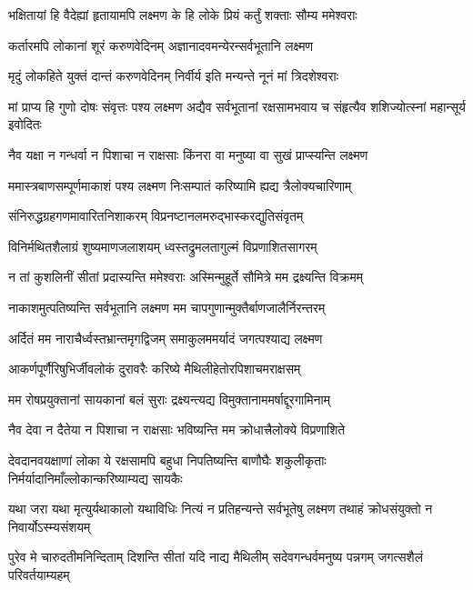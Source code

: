\twolineshloka
{भक्षितायां हि वैदेह्यां हृतायामपि लक्ष्मण}
{के हि लोके प्रियं कर्तुं शक्ताः सौम्य ममेश्वराः} %

\twolineshloka
{कर्तारमपि लोकानां शूरं करुणवेदिनम्}
{अज्ञानादवमन्येरन्सर्वभूतानि लक्ष्मण} %

\twolineshloka
{मृदुं लोकहिते युक्तं दान्तं करुणवेदिनम्}
{निर्वीर्य इति मन्यन्ते नूनं मां त्रिदशेश्वराः} %

\threelineshloka
{मां प्राप्य हि गुणो दोषः संवृत्तः पश्य लक्ष्मण}
{अद्यैव सर्वभूतानां रक्षसामभवाय च}
{संहृत्यैव शशिज्योत्स्नां महान्सूर्य इवोदितः} %

\twolineshloka
{नैव यक्षा न गन्धर्वा न पिशाचा न राक्षसाः}
{किंनरा वा मनुष्या वा सुखं प्राप्स्यन्ति लक्ष्मण} %

\twolineshloka
{ममास्त्रबाणसम्पूर्णमाकाशं पश्य लक्ष्मण}
{निःसम्पातं करिष्यामि ह्यद्य त्रैलोक्यचारिणाम्} %

\twolineshloka
{संनिरुद्धग्रहगणमावारितनिशाकरम्}
{विप्रनष्टानलमरुद्भास्करद्युतिसंवृतम्} %

\twolineshloka
{विनिर्मथितशैलाग्रं शुष्यमाणजलाशयम्}
{ध्वस्तद्रुमलतागुल्मं विप्रणाशितसागरम्} %

\twolineshloka
{न तां कुशलिनीं सीतां प्रदास्यन्ति ममेश्वराः}
{अस्मिन्मुहूर्ते सौमित्रे मम द्रक्ष्यन्ति विक्रमम्} %

\twolineshloka
{नाकाशमुत्पतिष्यन्ति सर्वभूतानि लक्ष्मण}
{मम चापगुणान्मुक्तैर्बाणजालैर्निरन्तरम्} %

\twolineshloka
{अर्दितं मम नाराचैर्ध्वस्तभ्रान्तमृगद्विजम्}
{समाकुलममर्यादं जगत्पश्याद्य लक्ष्मण} %

\twolineshloka
{आकर्णपूर्णैरिषुभिर्जीवलोकं दुरावरैः}
{करिष्ये मैथिलीहेतोरपिशाचमराक्षसम्} %

\twolineshloka
{मम रोषप्रयुक्तानां सायकानां बलं सुराः}
{द्रक्ष्यन्त्यद्य विमुक्तानाममर्षाद्दूरगामिनाम्} %

\twolineshloka
{नैव देवा न दैतेया न पिशाचा न राक्षसाः}
{भविष्यन्ति मम क्रोधात्त्रैलोक्ये विप्रणाशिते} %

\threelineshloka
{देवदानवयक्षाणां लोका ये रक्षसामपि}
{बहुधा निपतिष्यन्ति बाणौघैः शकुलीकृताः}
{निर्मर्यादानिमाँल्लोकान्करिष्याम्यद्य सायकैः} %

\threelineshloka
{यथा जरा यथा मृत्युर्यथाकालो यथाविधिः}
{नित्यं न प्रतिहन्यन्ते सर्वभूतेषु लक्ष्मण}
{तथाहं क्रोधसंयुक्तो न निवार्योऽस्म्यसंशयम्} %

\fourlineindentedshloka
{पुरेव मे चारुदतीमनिन्दिताम्}
{दिशन्ति सीतां यदि नाद्य मैथिलीम्}
{सदेवगन्धर्वमनुष्य पन्नगम्}
{जगत्सशैलं परिवर्तयाम्यहम्} %


